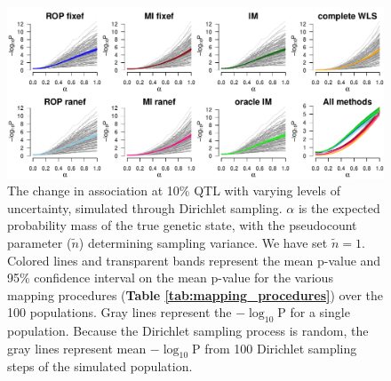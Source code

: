 \begin{figure}
\renewcommand{\familydefault}{\sfdefault}\normalfont
\centering
\includegraphics[width=\textwidth]{figures/4-mi/CC_pvalue_fluct_qtl_mean_count1.pdf}
\caption[Effect of uncertainty modeled through Dirichlet sampling on association at QTL in simulated data]{The change in association at 10\% QTL with varying levels of uncertainty, simulated through Dirichlet sampling. $\alpha$ is the expected probability mass of the true genetic state, with the pseudocount parameter ($\tilde{n}$) determining sampling variance. We have set $\tilde{n} = 1$.  Colored lines and transparent bands represent the mean p-value and 95\% confidence interval on the mean p-value for the various mapping procedures (\textbf{Table \ref{tab:mapping_procedures}}) over the 100 populations. Gray lines represent the $-\log_{10}\text{P}$ for a single population. Because the Dirichlet sampling process is random, the gray lines represent mean $-\log_{10}\text{P}$ from 100 Dirichlet sampling steps of the simulated population.\label{fig:multi_pval_count1_qtl}}
\end{figure}

